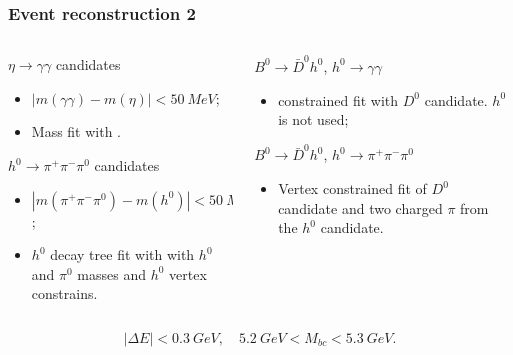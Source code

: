 \documentclass[10 pt,compress,mathserif]{beamer}
\newcommand{\bdh}{\ensuremath{B^0\to \bar D^0h^0}\xspace}
\newcommand{\hgg}{\ensuremath{h^0\to \gamma\gamma}\xspace}
\newcommand{\etagg}{\ensuremath{\eta\to \gamma\gamma}\xspace}
\newcommand{\hppp}{\ensuremath{h^0\to \pi^+\pi^-\pi^0}\xspace}
\begin{document}
\begin{frame}[containsverbatim]
 \frametitle{Event reconstruction 2}
 \begin{columns}
  \begin{column}{0.5\textwidth}
   \begin{block}{\etagg candidates}
    \begin{itemize}
     \item $\left|m(\gamma\gamma)-m(\eta)\right|<50\ MeV$;
     \item Mass fit with \verb@kfitter@.
    \end{itemize}
   \end{block}
   \begin{block}{\hppp candidates}
    \begin{itemize}
     \item $\left|m(\pi^+\pi^-\pi^0)-m(h^0)\right|<50\ MeV$;
     \item $h^0$ decay tree fit with \verb@ExKFitter@ with $h^0$ and $\pi^0$ masses and $h^0$ vertex constrains.
    \end{itemize}
   \end{block}
  \end{column}
  \begin{column}{0.5\textwidth}
  \begin{block}{\bdh, \hgg}
    \begin{itemize}
     \item \verb@IPTube@ constrained fit with $D^0$ candidate. $h^0$ is not used;
    \end{itemize}
   \end{block}
   \begin{block}{\bdh, \hppp}
    \begin{itemize}
     \item Vertex constrained fit of $D^0$ candidate and two charged $\pi$ from the $h^0$ candidate.
    \end{itemize}
   \end{block}
  \end{column}
 \end{columns}

 \begin{center}
  \begin{equation*}
   \left|\Delta E\right| < 0.3\ GeV,\quad 5.2\ GeV < M_{bc} < 5.3\ GeV.
  \end{equation*}
 \end{center}

\end{frame}
\end{document}
